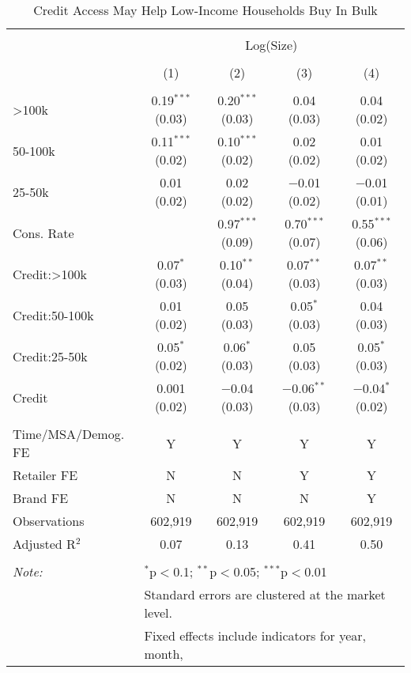 
\begin{table}[!htbp] \centering 
  \caption{Credit Access May Help Low-Income Households Buy In Bulk} 
  \label{tab:packageSizeFullTpLiq} 
\begin{tabular}{@{\extracolsep{5pt}}lcccc} 
\\[-1.8ex]\hline 
\hline \\[-1.8ex] 
 & \multicolumn{4}{c}{Log(Size)} \\ 
\\[-1.8ex] & (1) & (2) & (3) & (4)\\ 
\hline \\[-1.8ex] 
 >100k & 0.19$^{***}$ (0.03) & 0.20$^{***}$ (0.03) & 0.04 (0.03) & 0.04 (0.02) \\ 
  50-100k & 0.11$^{***}$ (0.02) & 0.10$^{***}$ (0.02) & 0.02 (0.02) & 0.01 (0.02) \\ 
  25-50k & 0.01 (0.02) & 0.02 (0.02) & $-$0.01 (0.02) & $-$0.01 (0.01) \\ 
  Cons. Rate &  & 0.97$^{***}$ (0.09) & 0.70$^{***}$ (0.07) & 0.55$^{***}$ (0.06) \\ 
  Credit:>100k & 0.07$^{*}$ (0.03) & 0.10$^{**}$ (0.04) & 0.07$^{**}$ (0.03) & 0.07$^{**}$ (0.03) \\ 
  Credit:50-100k & 0.01 (0.02) & 0.05 (0.03) & 0.05$^{*}$ (0.03) & 0.04 (0.03) \\ 
  Credit:25-50k & 0.05$^{*}$ (0.02) & 0.06$^{*}$ (0.03) & 0.05 (0.03) & 0.05$^{*}$ (0.03) \\ 
  Credit & 0.001 (0.02) & $-$0.04 (0.03) & $-$0.06$^{**}$ (0.03) & $-$0.04$^{*}$ (0.02) \\ 
 \hline \\[-1.8ex] 
Time/MSA/Demog. FE & Y & Y & Y & Y \\ 
Retailer FE & N & N & Y & Y \\ 
Brand FE & N & N & N & Y \\ 
Observations & 602,919 & 602,919 & 602,919 & 602,919 \\ 
Adjusted R$^{2}$ & 0.07 & 0.13 & 0.41 & 0.50 \\ 
\hline 
\hline \\[-1.8ex] 
\textit{Note:}  & \multicolumn{4}{l}{$^{*}$p$<$0.1; $^{**}$p$<$0.05; $^{***}$p$<$0.01} \\ 
 & \multicolumn{4}{l}{Standard errors are clustered at the market level.} \\ 
 & \multicolumn{4}{l}{Fixed effects include indicators for year, month, } \\ 

\end{tabular}
\end{table}
